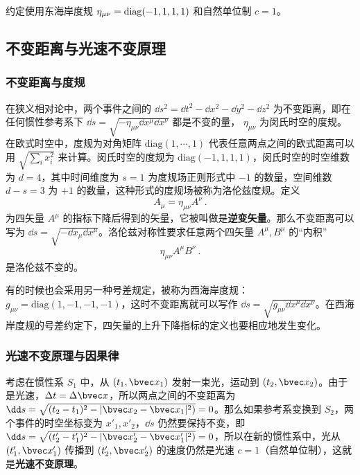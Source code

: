 

约定使用东海岸度规 $\eta_{\mu\nu}=\rm{diag}(-1,1,1,1)$ 和自然单位制 $c=1$。
\subsection{不变距离与光速不变原理}
\subsubsection{不变距离与度规}
在狭义相对论中，两个事件之间的 $\dd s^2=\dd t^2-\dd x^2-\dd y^2-\dd z^2$ 为不变距离，即在任何惯性参考系下 $\dd s=\sqrt{-\eta_{\mu\nu}\dd x^\mu \dd x^\nu}$ 都是不变的量， $\eta_{\mu\nu}$ 为闵氏时空的度规。 在欧式时空中，度规为对角矩阵 $\mathrm{diag}(1,\cdots,1)$ 代表任意两点之间的欧式距离可以用 $\sqrt{\sum_i x_i^2}$ 来计算。闵氏时空的度规为 $\mathrm{diag}(-1,1,1,1)$，闵氏时空的时空维数为 $d=4$，其中时间维度为 $s=1$ 为度规场正则形式中 $-1$ 的数量，空间维数 $d-s=3$ 为 $+1$ 的数量，这种形式的度规场被称为洛伦兹度规。定义
\begin{equation}
A_\mu = \eta_{\mu\nu}A^\nu~.
\end{equation}
为四矢量 $A^\mu$ 的指标下降后得到的矢量，它被叫做是\textbf{逆变矢量}。那么不变距离可以写为 $\dd s=\sqrt{-\dd x_\mu \dd x^\mu}$。洛伦兹对称性要求任意两个四矢量 $A^\mu, B^\mu$ 的“内积”
\begin{equation}
\eta_{\mu\nu} A^\mu B^\nu~.
\end{equation}
是洛伦兹不变的。

有的时候也会采用另一种号差规定，被称为西海岸度规： $g_{\mu\nu}=\mathrm{diag}(1,-1,-1,-1)$，这时不变距离就可以写作 $\dd s = \sqrt{g_{\mu\nu}\dd x^\mu \dd x^\nu}$。在西海岸度规的号差约定下，四矢量的上升下降指标的定义也要相应地发生变化。
\subsubsection{光速不变原理与因果律}

考虑在惯性系 $S_1$ 中，从 $(t_1,\bvec x_1)$ 发射一束光，运动到 $(t_2,\bvec x_2)$。由于是光速，$\Delta t=\Delta \bvec x$，所以两点之间的不变距离为 $\dd s=\sqrt{(t_2-t_1)^2-|\bvec x_2-\bvec x_1|^2)}=0$。那么如果参考系变换到 $S_2$，两个事件的时空坐标变为 $x'_1,x'_2$，$\dd s$ 仍然要保持不变，即 $\dd s=\sqrt{(t'_2-t'_1)^2-|\bvec x'_2-\bvec x'_1|^2)}=0$，所以在新的惯性系中，光从 $(t'_1,\bvec x'_1)$ 传播到 $(t'_2,\bvec x'_2)$ 的速度仍然是光速 $c=1$（自然单位制），这就是\textbf{光速不变原理}。

